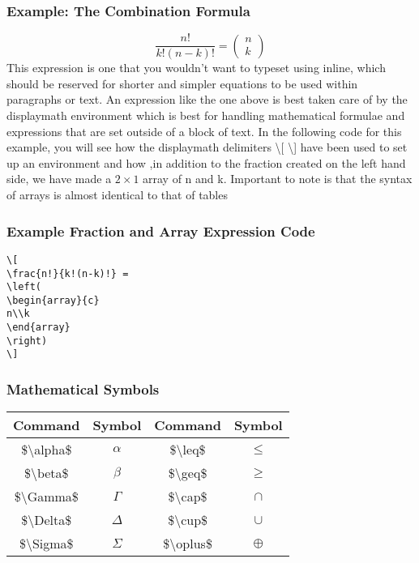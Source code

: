 \documentclass[12pt,journal,compsoc]{IEEEtran}
\begin{document}
\subsubsection*{Example: The Combination Formula}
\[ 
\frac{n!}{k!(n-k)!} =
\left( 
\begin{array}{c}
n\\k
\end{array}
\right)
\]
This expression is one that you wouldn't want to typeset using inline, which should be reserved for shorter and simpler equations to be used within paragraphs or text. An expression like the one above is best taken care of by the displaymath environment which is best for handling mathematical formulae and expressions that are set outside of a block of text. In the following code for this example, you will see how the displaymath delimiters \textbackslash[ \textbackslash] have been used to set up an environment and how ,in addition to the fraction created on the left hand side, we have made a $2\times1$ array of n and k. Important to note is that the syntax of arrays is almost identical to that of tables
\subsubsection*{Example Fraction and Array Expression Code}
{\small
\begin{center}
\begin{verbatim}
\[ 
\frac{n!}{k!(n-k)!} =
\left( 
\begin{array}{c}
n\\k
\end{array}
\right)
\]
\end{verbatim}
\end{center}}

\subsubsection*{Mathematical Symbols}
\begin{center}
\begin{tabular}{c c | c c}
Command & Symbol & Command & Symbol\\
\hline
\$\textbackslash alpha\$ & $\alpha$ & \$\textbackslash leq\$ & $\leq$\\
\hline
\$\textbackslash beta\$ & $\beta$ & \$\textbackslash geq\$ & $\geq$\\
\hline
\$\textbackslash Gamma\$ & $\Gamma$ & \$\textbackslash cap\$ & $\cap$\\
\hline
\$\textbackslash Delta\$ & $\Delta$ & \$\textbackslash cup\$ & $\cup$\\
\hline
\$\textbackslash Sigma\$ & $\Sigma$ & \$\textbackslash oplus\$ & $\oplus$\\
\end{tabular}
\end{center}
\end{document}
